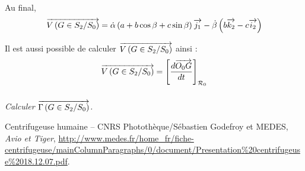 \documentclass[10pt,fleqn]{article} %
\begin{document}
\begin{multicols}{2}
\begin{corrige}
Au final, 
$$\overrightarrow{V\left( {G} \in {S_2}/{S_0}\right)} = \dot{\alpha} \left(a+b \cos\beta + c \sin\beta\right) \overrightarrow{j_1} 
-\dot{\beta}\left(b\overrightarrow{k_2}-c\overrightarrow{i_2} \right)
$$

Il est aussi possible de calculer $\overrightarrow{V\left( {G} \in {S_2}/{S_0}\right)}$ ainsi : 
$$\overrightarrow{V\left( {G} \in {S_2}/{S_0}\right)} = \left[\dfrac{d \overrightarrow{O_0G}}{dt}\right]_{\mathcal{R}_0}$$ 

\end{corrige}\else \fi




\subparagraph{}
\textit{Calculer $\overrightarrow{\Gamma \left( {G} \in {S_2}/{S_0}\right)}$.}
\ifprof
\begin{corrige}
\end{corrige}\else \fi



\begin{thebibliography}{2}
 Centrifugeuse humaine -- CNRS Photothèque/Sébastien Godefroy et MEDES, \textit{Avio et Tiger}, \url{http://www.medes.fr/home_fr/fiche-centrifugeuse/mainColumnParagraphs/0/document/Presentation\%20centrifugeuse%2018.12.07.pdf}.
\end{thebibliography}
\end{multicols}
\newpage \setcounter{exo}{0}
\end{document}

